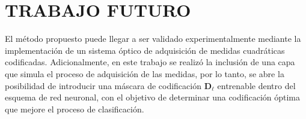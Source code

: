 
\chapter{TRABAJO FUTURO}


El método propuesto puede llegar a ser validado experimentalmente mediante la implementación de un sistema óptico de adquisición de medidas cuadráticas codificadas. Adicionalmente, en este trabajo se realizó la inclusión de una capa que simula el proceso de adquisición de las medidas, por lo tanto, se abre la posibilidad de introducir una máscara de codificación $\mathbf{D}_\ell$ entrenable dentro del esquema de red neuronal, con el objetivo de determinar una codificación óptima que mejore el proceso de clasificación.
